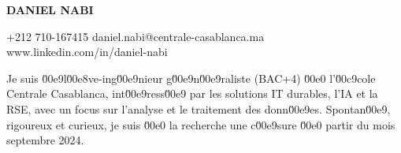 \documentclass[a4paper,11pt]{article}
\begin{document}
\begin{minipage}{\textwidth}
    \vspace{7ex}
        \par{
        \centering
        \vspace{-0.9in}
            \textcolor{linkcolour}{\Large \textbf{DANIEL NABI}}
        \par}
\end{minipage}

\begin{flushleft}
 +212 710-167415
daniel.nabi@centrale-casablanca.ma
www.linkedin.com/in/daniel-nabi
\end{flushleft}
\vspace{6ex}

\noindent
Je suis \u00e9l\u00e8ve-ing\u00e9nieur g\u00e9n\u00e9raliste (BAC+4) \u00e0 l'\u00c9cole Centrale Casablanca, int\u00e9ress\u00e9 par les solutions IT durables, l'IA et la RSE, avec un focus sur l'analyse et le traitement des donn\u00e9es. Spontan\u00e9, rigoureux et curieux, je suis \u00e0 la recherche une c\u00e9sure \u00e0 partir du mois septembre 2024.
\end{document}
